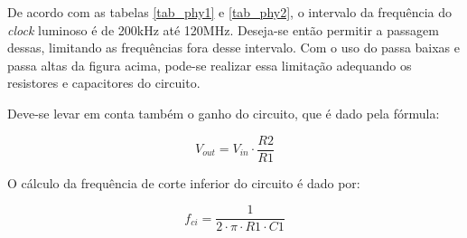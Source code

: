 	De acordo com as tabelas \ref{tab_phy1} e \ref{tab_phy2}, o intervalo da frequência do \textit{clock} luminoso é de 200kHz até 120MHz. Deseja-se então  permitir a passagem dessas, limitando as frequências fora desse intervalo. Com o uso do passa baixas e passa altas da figura acima, pode-se realizar essa limitação adequando os resistores e capacitores do circuito.
	

	
	Deve-se levar em conta também o ganho do circuito, que é dado pela fórmula:
	
	\begin{equation}
	V_{out} = V_{in} \cdot \frac{R2}{R1}
	\end{equation}
	
	O cálculo da frequência de corte inferior do circuito é dado por: 
	
	\begin{equation} \label{eq:1}
	f_{ci} = \frac{1}{2 \cdot \pi \cdot R1 \cdot C1}
	\end{equation}
	
